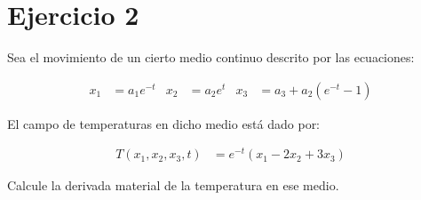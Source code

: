 \documentclass[a4paper,10pt,twoside,final,spanish]{article}
\begin{document}
\section*{Ejercicio 2}

Sea el movimiento de un cierto medio continuo descrito por las ecuaciones:

\begin{align*}
x_{1} &= a_{1}e^{-t}
& x_{2} &= a_{2}e^{t}
& x_{3} &= a_{3}+a_{2}(e^{-t}-1) 
\end{align*}

El campo de temperaturas en dicho medio está dado por:

\begin{align*}
T(x_{1},x_{2},x_{3},t) &= e^{-t}(x_{1}-2x_{2}+3x_{3})
\end{align*}

Calcule la derivada material de la temperatura en ese medio.

\dotfill
\end{document}
